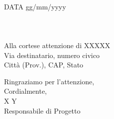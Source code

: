 \documentclass[11pt, a4paper]{letter} %
\begin{document}
\begin{letter}{
	\-\\\-
	DATA gg/mm/yyyy
	\-\\\-\\\-\\\-\\
	Alla cortese attenzione di XXXXX\\
	Via destinatario, numero civico\\
	Città (Prov.), CAP, Stato
}
\closing{Ringraziamo per l'attenzione,\\
Cordialmente,\\
X Y\\
Responsabile di Progetto
}




\end{letter}
\end{document}
